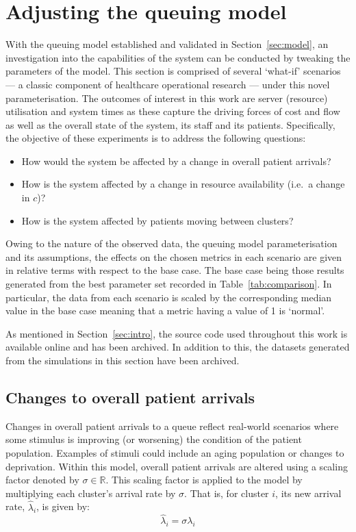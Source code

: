 \section{Adjusting the queuing model}\label{sec:scenarios}

With the queuing model established and validated in Section~\ref{sec:model}, an
investigation into the capabilities of the system can be conducted by tweaking
the parameters of the model. This section is comprised of several `what-if'
scenarios --- a classic component of healthcare operational research --- under
this novel parameterisation. The outcomes of interest in this work are server
(resource) utilisation and system times as these capture the driving forces of
cost and flow as well as the overall state of the system, its staff and its
patients.  Specifically, the objective of these experiments is to address the
following questions:
\begin{itemize}
    \item How would the system be affected by a change in overall patient
        arrivals?
    \item How is the system affected by a change in resource availability (i.e.\
        a change in \(c\))?
    \item How is the system affected by patients moving between clusters?
\end{itemize}

Owing to the nature of the observed data, the queuing model parameterisation
and its assumptions, the effects on the chosen metrics in each scenario are
given in relative terms with respect to the base case. The base case being those
results generated from the best parameter set recorded in
Table~\ref{tab:comparison}. In particular, the data from each scenario is scaled
by the corresponding median value in the base case meaning that a metric having
a value of 1 is `normal'.

As mentioned in Section~\ref{sec:intro}, the source code used throughout this
work is available online and has been archived. %
In addition to this, the datasets generated from the simulations in this section
have been archived. %


\subsection{Changes to overall patient arrivals}\label{subsec:arrivals}

Changes in overall patient arrivals to a queue reflect real-world scenarios
where some stimulus is improving (or worsening) the condition of the patient
population. Examples of stimuli could include an aging population or
changes to deprivation. Within this model, overall patient arrivals are altered
using a scaling factor denoted by \(\sigma\in\mathbb{R}\). This scaling factor
is applied to the model by multiplying each cluster's arrival rate by
\(\sigma\). That is, for cluster \(i\), its new arrival rate, \(\hat\lambda_i\),
is given by:
\begin{equation}\label{eq:lambda}
    \hat\lambda_{i} = \sigma\lambda_i
\end{equation}

